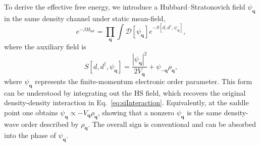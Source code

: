 \documentclass[aps,prl,article,twocolumn,preprintnumbers,amsmath,amssymb,superscriptaddress]{revtex4-2}
\begin{document}
To derive the effective free energy, we introduce a Hubbard--Stratonovich
field $\psi_{\mathbf q}$ in the same density channel under static mean-field,
\begin{equation}
e^{-\beta H_{\mathrm{int}}}
=
\prod_{\mathbf q}
\int
\mathcal D[\psi_{\mathbf q}]
e^{-S[d,d^\dagger,\psi_{\mathbf q}]},
\end{equation}
where the auxiliary field is 
\begin{equation}
\label{eq:siHSField}
S[d,d^\dagger,\psi_{\mathbf q}]
=
\frac{
|\psi_{\mathbf q}|^2
}{
2V_{\mathbf q}
}
+
\psi_{-\mathbf q}\rho_{\mathbf q},
\end{equation}
where $\psi_{\mathbf q}$ represents the finite-momentum electronic order
parameter.  This form can be understood by integrating out the HS field,
which recovers the original density-density interaction in
Eq.~\eqref{eq:siInteraction}.  Equivalently, at the saddle point one
obtains $\psi_{\mathbf q}\propto -V_{\mathbf q}\rho_{\mathbf q}$,
showing that a nonzero $\psi_{\mathbf q}$ is the same density-wave order
described by $\rho_{\mathbf q}$.  The overall sign is conventional and
can be absorbed into the phase of $\psi_{\mathbf q}$.
\end{document}
